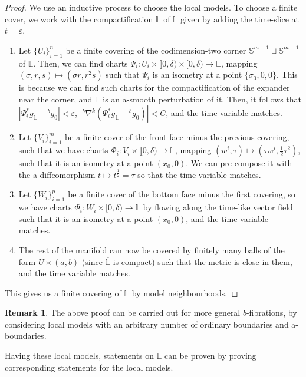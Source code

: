 \documentclass[10pt, a4paper]{article}
\theoremstyle{plain}%
\theoremstyle{definition}
\newtheorem{rem}[theorem]{Remark}
\numberwithin{figure}{section}
\numberwithin{equation}{section}
\newcommand{\bL}{\mathbb{L}}
\newcommand{\bS}{\mathbb{S}}
\newcommand{\rt}{\rightarrow}
\newcommand{\ep}{\varepsilon}
\begin{document}
\begin{proof}
	We use an inductive process to choose the local models. To choose a finite cover, we work with the compactification $\overline{\bL}$ of $\bL$ given by adding the time-slice at $t=\ep$.
	\begin{enumerate}
		\item Let $\{U_i\}_{i=1}^n$ be a finite covering of the codimension-two corner $\bS^{m-1}\sqcup\bS^{m-1} $ of $\bL$. Then, we can find charts $\Psi_i: U_i\times\llbracket0,\delta)\times [0,\delta) \rt \bL$, mapping $(\sigma,r,s)\mapsto (\sigma r, r^2s)$ such that $\Psi_i$ is an isometry at a point $\{\sigma_0,0,0\}$. This is because we can find such charts for the compactification of the expander near the corner, and $\bL$ is an a-smooth perturbation of it. Then, it follows that $|\Psi_i^*g_\bL-{^bg}_0|<\varepsilon$, $|^b\nabla^k(\Psi_i^*g_\bL-{^bg}_0)|<C$, and the time variable matches.
		\item Let $\{V_i\}_{i=1}^m$ be a finite cover of the front face minus the previous covering, such that we have charts $\Phi_i : V_i\times\llbracket0,\delta) \rt \bL$, mapping $(w^i,\tau)\mapsto (\tau w^i,\frac{1}{2}\tau^2)$, such that it is an isometry at a point $(x_0,0)$. We can pre-compose it with the a-diffeomorphism $t\mapsto t^{\frac{1}{2}}=\tau$ so that the time variable matches.
		\item Let $\{W_i\}_{i=1}^p$ be a finite  cover of the bottom face minus the first covering, so we have charts $\Phi_i : W_i \times [0,\delta) \rt \bL$ by flowing along the time-like vector field such that it is an isometry at a point $(x_0,0)$, and the time variable matches.
		\item The rest of the manifold can now be covered by finitely many balls of the form $U\times(a,b)$ (since $\overline{\bL}$ is compact) such that the metric is close in them, and the time variable matches.
	\end{enumerate}
	This gives us a finite covering of $\bL$ by model neighbourhoods.
\end{proof}
\begin{rem}
	The above proof can be carried out for more general $b$-fibrations, by considering local models with an arbitrary number of ordinary boundaries and a-boundaries.
\end{rem}

Having these local models, statements on $\bL$ can be proven by proving corresponding statements for the local models.
\end{document}
